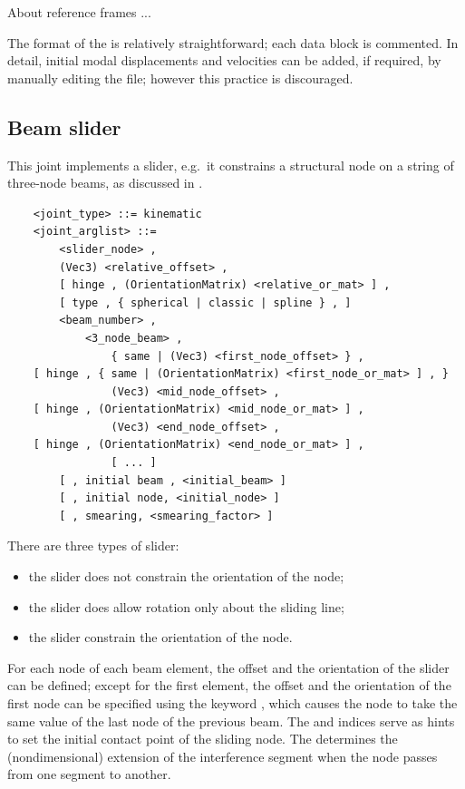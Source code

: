 \noindent
About reference frames ...

\noindent
The format of the  is relatively straightforward;
each data block is commented.
In detail, initial modal displacements and velocities can be added,
if required, by manually editing the file; however this practice
is discouraged.



\subsection{Beam slider}
This joint implements a slider, e.g.\ it constrains a structural node 
on a string of three-node beams, as discussed in \cite{SLIDER-AIDAA-2003}.
\begin{verbatim}
    <joint_type> ::= kinematic
    <joint_arglist> ::=
        <slider_node> ,
        (Vec3) <relative_offset> ,
        [ hinge , (OrientationMatrix) <relative_or_mat> ] ,
        [ type , { spherical | classic | spline } , ]
        <beam_number> ,
            <3_node_beam> ,
                { same | (Vec3) <first_node_offset> } ,
    [ hinge , { same | (OrientationMatrix) <first_node_or_mat> ] , }
                (Vec3) <mid_node_offset> ,
    [ hinge , (OrientationMatrix) <mid_node_or_mat> ] ,
                (Vec3) <end_node_offset> ,
    [ hinge , (OrientationMatrix) <end_node_or_mat> ] ,
                [ ... ]
        [ , initial beam , <initial_beam> ]
        [ , initial node, <initial_node> ]
        [ , smearing, <smearing_factor> ]
\end{verbatim}
There are three types of slider:
\begin{itemize}
	\item the  slider does not constrain
	the orientation of the node;
	\item the  slider does allow rotation
	only about the sliding line;
	\item the  slider constrain the orientation
	of the node.
\end{itemize}
For each node of each beam element, the offset and the orientation
of the slider can be defined; except for the first element, the
offset and the orientation of the first node can be specified using
the keyword , which causes the node to take the same
value of the last node of the previous beam.
The  and  indices
serve as hints to set the initial contact point of the sliding node.
The  determines the (nondimensional) extension
of the interference segment when the node passes from one segment
to another. %


